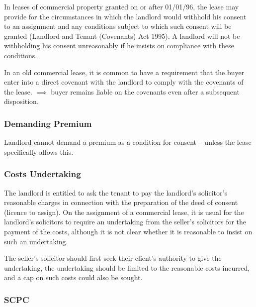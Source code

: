 \documentclass[
]{article}
\newenvironment{Shaded}{}{}
\newcommand{\NormalTok}[1]{#1}
\begin{document}
In leases of commercial property granted on or after 01/01/96, the lease
may provide for the circumstances in which the landlord would withhold
his consent to an assignment and any conditions subject to which such
consent will be granted (Landlord and Tenant (Covenants) Act 1995). A
landlord will not be withholding his consent unreasonably if he insists
on compliance with these conditions.

In an old commercial lease, it is common to have a requirement that the
buyer enter into a direct covenant with the landlord to comply with the
covenants of the lease. \(\implies\) buyer remains liable on the
covenants even after a subsequent disposition.

\hypertarget{demanding-premium}{%
\subsubsection{Demanding Premium}\label{demanding-premium}}

Landlord cannot demand a premium as a condition for consent -- unless
the lease specifically allows this.

\hypertarget{costs-undertaking}{%
\subsubsection{Costs Undertaking}\label{costs-undertaking}}

The landlord is entitled to ask the tenant to pay the landlord's
solicitor's reasonable charges in connection with the preparation of the
deed of consent (licence to assign). On the assignment of a commercial
lease, it is usual for the landlord's solicitors to require an
undertaking from the seller's solicitors for the payment of the costs,
although it is not clear whether it is reasonable to insist on such an
undertaking.

\begin{Shaded}
\begin{Highlighting}[]
\NormalTok{The seller’s solicitor should first seek their client’s authority to give the undertaking, the undertaking should be limited to the reasonable costs incurred, and a cap on such costs could also be sought.}
\end{Highlighting}
\end{Shaded}

\hypertarget{scpc}{%
\subsubsection{SCPC}\label{scpc}}
\end{document}
